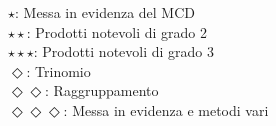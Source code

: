 \begin{questions}
{	$\star$: Messa in evidenza del MCD \\
	$\star\star$: Prodotti notevoli di grado 2 \\
	$\star\star\star$: Prodotti notevoli di grado 3 \\
	$\Diamond$: Trinomio \\
	$\Diamond\Diamond$: Raggruppamento\\
	$\Diamond\Diamond\Diamond$: Messa in evidenza e metodi vari
}

\begin{minipage}{\linewidth}
	\begin{multicols}{2}
		\begin{parts}
%			
%			
%			
%			
%			
%			
%			

\end{parts}
\end{multicols}
\end{minipage}
\end{questions}
